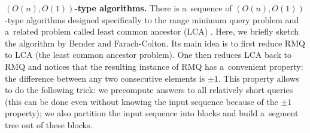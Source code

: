 \textbf{$(O(n), O(1))$-type algorithms.}
There is a~sequence of $(O(n), O(1))$-type algorithms designed specifically to
the range minimum query problem and a~related problem called least common
ancestor (LCA) \cite{DBLP:journals/siamcomp/BerkmanV93,
DBLP:journals/jal/BenderFPSS05,
DBLP:conf/latin/BenderF00,
DBLP:conf/cpm/FischerH06}. Here, we briefly sketch the algorithm by Bender and
Farach-Colton. Its main idea is to first reduce RMQ to LCA (the least common
ancestor problem). One then reduces LCA back to RMQ and notices that the
resulting instance of RMQ has a~convenient property: the difference between any
two consecutive elements is $\pm 1$. This property allows to do the following
trick: we precompute answers to all relatively short queries (this can be done
even without knowing the input sequence because of the $\pm 1$ property); we
also partition the input sequence into blocks and build a~segment tree out of
these blocks.
